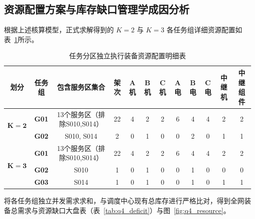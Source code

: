 \subsection{资源配置方案与库存缺口管理学成因分析}

根据上述核算模型，正式求解得到的 $K=2$ 与 $K=3$ 各任务组详细资源配置如表~\ref{tab:q4_partition}所示。

\begin{table}[htbp]
  \centering
  \caption{任务分区独立执行装备资源配置明细表}
  \label{tab:q4_partition}
  \fontsize{9pt}{12pt}\selectfont
  \begin{tabular}{cccccccccccc}
    \toprule
    \textbf{划分} & \textbf{任务组} & \textbf{包含服务区集合} & \textbf{架次} & \textbf{A机} & \textbf{B机} & \textbf{C机} & \textbf{A电} & \textbf{B电} & \textbf{C电} & \textbf{中继机} & \textbf{中继组件} \\
    \midrule
    \multirow{2}{*}{$\bm{K=2}$} 
    & \textbf{G01} & 13个服务区（排除S010,S014） & 22 & 4 & 2 & 2 & 6 & 4 & 4 & 2 & 2 \\
    & \textbf{G02} & S010, S014 & 2 & 0 & 1 & 0 & 0 & 2 & 0 & 1 & 1 \\
    \midrule
    \multirow{3}{*}{$\bm{K=3}$} 
    & \textbf{G01} & 13个服务区（排除S010,S014） & 22 & 4 & 2 & 2 & 6 & 4 & 4 & 2 & 2 \\
    & \textbf{G02} & S010 & 1 & 0 & 1 & 0 & 0 & 1 & 0 & 0 & 0 \\
    & \textbf{G03} & S014 & 1 & 0 & 1 & 0 & 0 & 1 & 0 & 1 & 1 \\
    \bottomrule
  \end{tabular}
\end{table}

将各任务组独立并发需求求和，与调度中心现有总库存进行严格比对，得到全网装备总需求与资源缺口大盘表（表~\ref{tab:q4_deficit}）与图~\ref{fig:q4_resource}。

